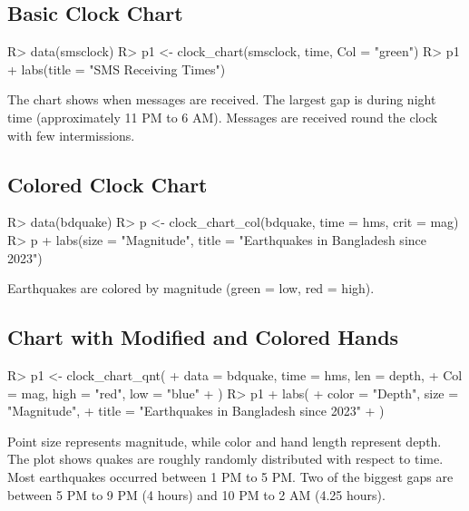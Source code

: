 \documentclass[article]{jss}
\begin{document}
\subsection{Basic Clock Chart}

\begin{Schunk}
\begin{Sinput}
R> data(smsclock)
R> p1 <- clock_chart(smsclock, time, Col = "green")
R> p1 + labs(title = "SMS Receiving Times")
\end{Sinput}
\end{Schunk}

The chart shows when messages are received. The largest gap is during night time (approximately 11 PM to 6 AM). Messages are received round the clock with few intermissions.

\subsection{Colored Clock Chart}

\begin{Schunk}
\begin{Sinput}
R> data(bdquake)
R> p <- clock_chart_col(bdquake, time = hms, crit = mag)
R> p + labs(size = "Magnitude", title = "Earthquakes in Bangladesh since 2023")
\end{Sinput}
\end{Schunk}

Earthquakes are colored by magnitude (green = low, red = high).

\subsection{Chart with Modified and Colored Hands}

\begin{Schunk}
\begin{Sinput}
R> p1 <- clock_chart_qnt(
+    data = bdquake, time = hms, len = depth,
+    Col = mag, high = "red", low = "blue"
+  )
R> p1 + labs(
+    color = "Depth", size = "Magnitude",
+    title = "Earthquakes in Bangladesh since 2023"
+  )
\end{Sinput}
\end{Schunk}

Point size represents magnitude, while color and hand length represent depth. The plot shows quakes are roughly randomly distributed with respect to time. Most earthquakes occurred between 1 PM to 5 PM. Two of the biggest gaps are between 5 PM to 9 PM (4 hours) and 10 PM to 2 AM (4.25 hours).
\end{document}
